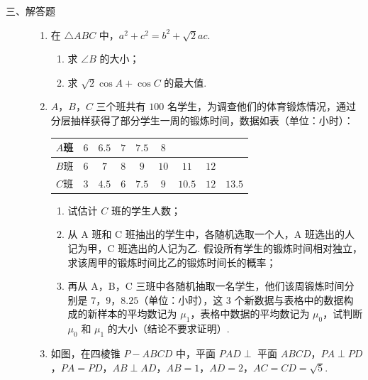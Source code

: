 \begin{description}

    \item[三、解答题]

    \begin{enumerate}[leftmargin=5pt]

      \addtocounter{enumi}{+14}

        \item 在 \(\triangle ABC\) 中，\(a^2+c^2=b^2+\sqrt{2}ac\).

\begin{enumerate}
\item 求 \(\angle B\) 的大小；
\item 求 \(\sqrt{2}\cos A+\cos C\) 的最大值.
\end{enumerate}

        \item \(A\)，\(B\)，\(C\) 三个班共有 \(100\) 名学生，为调查他们的体育锻炼情况，通过分层抽样获得了部分学生一周的锻炼时间，数据如表（单位：小时）：

\begin{center}
\begin{tabular}{|c|cccccccc|}
\hline
\(A\)班 & \(6\) & \(6.5\) & \(7\) & \(7.5\) & \(8\) & & & \\
\hline
\(B\)班 & \(6\) & \(7\) & \(8\) & \(9\) & \(10\) & \(11\) & \(12\) & \\
\hline
\(C\)班 & \(3\) & \(4.5\) & \(6\) & \(7.5\) & \(9\) & \(10.5\) & \(12\) & \(13.5\) \\
\hline
\end{tabular}
\end{center}

\begin{enumerate}
\item 试估计 \(C\) 班的学生人数；
\item 从 A 班和 C 班抽出的学生中，各随机选取一个人，A 班选出的人记为甲，C 班选出的人记为乙. 假设所有学生的锻炼时间相对独立，求该周甲的锻炼时间比乙的锻炼时间长的概率；
\item 再从 A，B，C 三班中各随机抽取一名学生，他们该周锻炼时间分别是 \(7\)，\(9\)，\(8.25\)（单位：小时），这 \(3\) 个新数据与表格中的数据构成的新样本的平均数记为 \(\mu_1\)，表格中数据的平均数记为 \(\mu_0\)，试判断 \(\mu_0\) 和 \(\mu_1\) 的大小（结论不要求证明）.
\end{enumerate}

        \item 如图，在四棱锥 \(P-ABCD\) 中，平面 \(PAD\perp\) 平面 \(ABCD\)，\(PA\perp PD\)，\(PA=PD\)，\(AB\perp AD\)，\(AB=1\)，\(AD=2\)，\(AC=CD=\sqrt5\).


\end{enumerate}
\end{description}
